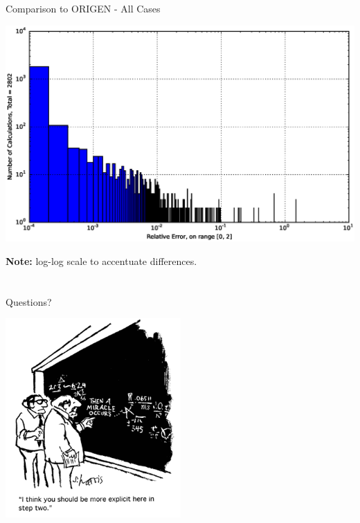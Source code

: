 \documentclass[xcolor=x11names,compress]{beamer}
\begin{document}
\begin{frame}{Comparison to ORIGEN - All Cases}

    \begin{center}
    \includegraphics[scale=0.45]{decay-relative-error-histogram.eps}
    \end{center}

    \vspace*{-1em}
    \textbf{Note:} log-log scale to accentuate differences.

\end{frame}


\section*{}
\begin{frame}[fragile]{Questions?}

    \begin{center}
    \includegraphics[height=3in,clip]{questions-comic.png}
    \end{center}

\end{frame}
\end{document}
